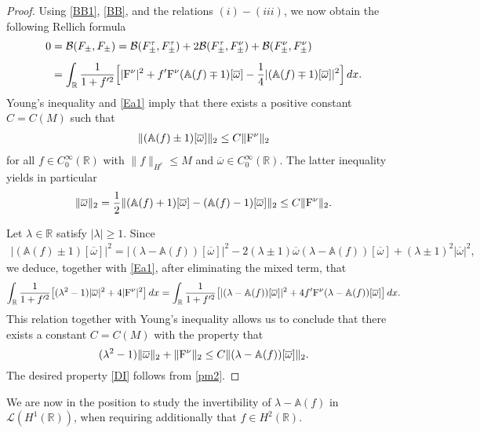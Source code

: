 \documentclass[11pt,reqno]{amsart}
\numberwithin{equation}{section}
\newcommand{\0}{\Omega}
\newcommand{\ov}{\overline}
\newcommand{\oo}{\ov\omega}
\newcommand{\bA}{\mathbb{A}}
\newcommand{\B}{\mathcal{B}}
\newcommand{\kL}{\mathcal{L}}
\newcommand{\R}{\mathbb{R}}
\numberwithin{equation}{section}
\begin{document}
\begin{proof}
Using \eqref{BB1}, \eqref{BB}, and the relations $(i)-(iii)$, we now obtain the following Rellich formula 
\begin{align}\label{Ea1}
 0&=\B(F_\pm,F_\pm)= \B(F_\pm^\tau,F_\pm^\tau)+2 \B(F_\pm^\tau,F_\pm^\nu)+ \B(F_\pm^\nu,F_\pm^\nu)\nonumber\\[1ex]
 &=\int_\R\frac{1}{1+f'^2}\Big[| {\rm F}^\nu|^2+f' {\rm F}^\nu(\bA(f)\mp1)[\oo]-    \frac{1}{4}|(\bA(f)\mp1)[\oo]|^2\Big]\, dx.
 \end{align}
    Young's inequality and \eqref{Ea1} imply that there exists a positive constant $C=C(M)$ such that 
\begin{align*} 
\|(\bA(f)\pm1)[\oo]\|_2\leq C\| {\rm F}^\nu\|_2
\end{align*}
for all $f\in C^\infty_0(\R)$ with $\|f\|_{H^r}\leq M$ and   $\ov\omega\in C_0^\infty(\R).$
The latter inequality yields in particular 
\begin{align} \label{pm2}
  \|\oo\|_2=\frac{1}{2}\|(\bA(f)+1)[\oo]-(\bA(f)-1)[\oo]\|_2\leq C\| {\rm F}^\nu\|_2.
\end{align}



Let  $\lambda\in\R$ satisfy $|\lambda|\geq1$. Since
\begin{align*}
  |(\bA(f)\pm1)[\oo]|^2=  |(\lambda-\bA(f))[\oo] |^2-2(\lambda\pm1)\oo(\lambda-\bA(f))[\oo] + (\lambda\pm 1)^2|\oo|^2,
\end{align*}
  we deduce, together with \eqref{Ea1}, after  eliminating the mixed term, that  
\begin{align*} 
 \int_\R\frac{1}{1+f'^2}\big[(\lambda^2-1)|\oo|^2+4| {\rm F}^\nu|^2\big]\, dx=\int_\R\frac{1}{1+f'^2}\big[|(\lambda-\bA(f))[\oo]|^2+4f' {\rm F}^\nu(\lambda-\bA(f))[\oo] \big]\, dx.
 \end{align*}
 This relation together with Young's inequality allows us to conclude that there exists a constant  $C=C(M)$ with the property that
 \[
 (\lambda^2-1)\|\oo\|_2+\| {\rm F}^\nu\|_2\leq C \|(\lambda-\bA(f))[\oo]\|_2.
 \]
 The desired property \eqref{DI} follows from \eqref{pm2}.
 \end{proof}





We are now in the position to study the  invertibility of $\lambda-\bA(f)$ in   $\kL(H^1(\R))$, when  requiring additionally that $f\in H^2(\R).$
 
\end{document}
